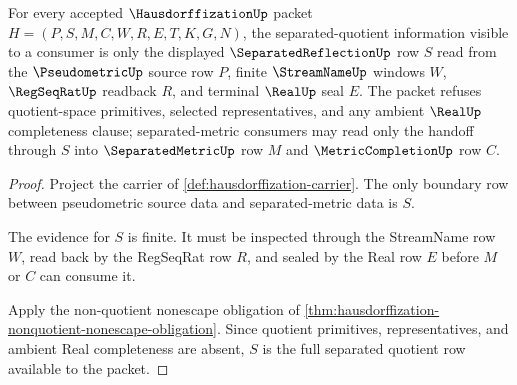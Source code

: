 \begin{theorem}
\label{thm:hausdorffization-separated-quotient-row}
For every accepted $\HausdorffizationUp$ packet $H=(P,S,M,C,W,R,E,T,K,G,N)$, the separated-quotient information visible to a consumer is only the displayed $\SeparatedReflectionUp$ row $S$ read from the $\PseudometricUp$ source row $P$, finite $\StreamNameUp$ windows $W$, $\RegSeqRatUp$ readback $R$, and terminal $\RealUp$ seal $E$. The packet refuses quotient-space primitives, selected representatives, and any ambient $\RealUp$ completeness clause; separated-metric consumers may read only the handoff through $S$ into $\SeparatedMetricUp$ row $M$ and $\MetricCompletionUp$ row $C$.
\end{theorem}
\begin{proof}
Project the carrier of \autoref{def:hausdorffization-carrier}. The only boundary row between pseudometric source data and separated-metric data is $S$.

The evidence for $S$ is finite. It must be inspected through the StreamName row $W$, read back by the RegSeqRat row $R$, and sealed by the Real row $E$ before $M$ or $C$ can consume it.

Apply the non-quotient nonescape obligation of \autoref{thm:hausdorffization-nonquotient-nonescape-obligation}. Since quotient primitives, representatives, and ambient Real completeness are absent, $S$ is the full separated quotient row available to the packet.
\end{proof}

